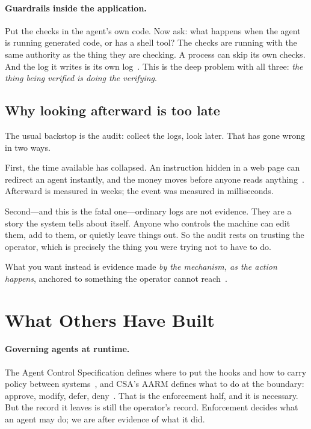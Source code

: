 \documentclass[11pt]{article}
\begin{document}
\paragraph{Guardrails inside the application.} Put the checks in the agent's %
own code. Now ask: what happens when the agent is running generated code, or
has a shell tool? The checks are running with the same authority as the thing
they are checking. A process can skip its own checks. And the log it writes is
its own log~\cite{netbankaudit2026}. This is the deep problem with all three:
\emph{the thing being verified is doing the verifying}.

\subsection{Why looking afterward is too late}

The usual backstop is the audit: collect the logs, look later. That has gone
wrong in two ways.

First, the time available has collapsed. An instruction hidden in a web page
can redirect an agent instantly, and the money moves before anyone reads
anything~\cite{airia2026}. Afterward is measured in weeks; the event was
measured in milliseconds.

Second---and this is the fatal one---ordinary logs are not evidence. They are
a story the system tells about itself. Anyone who controls the machine can
edit them, add to them, or quietly leave things out. So the audit rests on
trusting the operator, which is precisely the thing you were trying not to
have to do.

What you want instead is evidence made \emph{by the mechanism, as the action
happens}, anchored to something the operator cannot
reach~\cite{redhat2026,eqty2026}.

\section{What Others Have Built}
\label{sec:related}

\paragraph{Governing agents at runtime.} The Agent Control Specification
defines where to put the hooks and how to carry policy between
systems~\cite{acs2026,acsms2026}, and CSA's AARM defines what to do at the
boundary: approve, modify, defer, deny~\cite{csaaarm}. That is the enforcement
half, and it is necessary. But the record it leaves is still the operator's
record. Enforcement decides what an agent may do; we are after evidence of
what it did.
\end{document}
